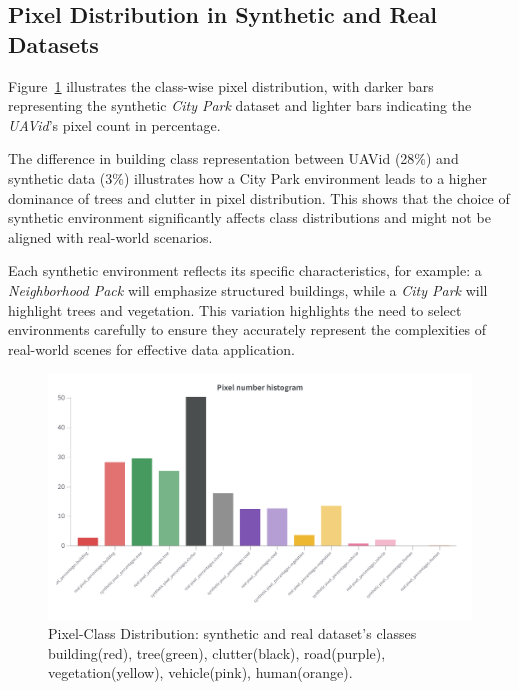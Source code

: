 \documentclass[../report.tex]{subfiles}
\begin{document}
    \subsection{Pixel Distribution in Synthetic and Real Datasets}
    Figure~\ref{fig:pixel_analysis} illustrates the class-wise pixel distribution, with darker bars representing the synthetic \textit{City Park} dataset and lighter bars indicating the \textit{UAVid}'s pixel count in percentage.
    
    The difference in building class representation between UAVid (28\%) and synthetic data (3\%) illustrates how a City Park environment leads to a higher dominance of trees and clutter in pixel distribution. This shows that the choice of synthetic environment significantly affects class distributions and might not be aligned with real-world scenarios. 

    Each synthetic environment reflects its specific characteristics, for example: a \textit{Neighborhood Pack} will emphasize structured buildings, while a \textit{City Park} will highlight trees and vegetation. This variation highlights the need to select environments carefully to ensure they accurately represent the complexities of real-world scenes for effective data application.

    \begin{figure}[h]
        \centering
        \includegraphics[width=0.9\linewidth]{figures/pixel_analysis.png}
        \caption{Pixel-Class Distribution: synthetic and real dataset's classes building(red), tree(green), clutter(black), road(purple), vegetation(yellow), vehicle(pink), human(orange).}
        \label{fig:pixel_analysis}
    \end{figure}
    
    
\end{document}
